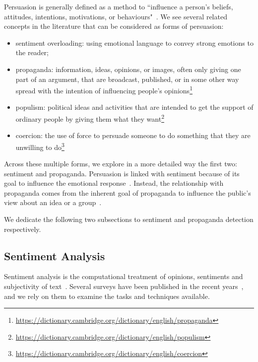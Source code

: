 Persuasion is generally defined as a method to ``influence a person's beliefs, attitudes, intentions, motivations, or behaviours"~\cite{gass2018persuasion}.
We see several related concepts in the literature that can be considered as forms of persuasion:
\begin{itemize}
    \item sentiment overloading: using emotional language to convey strong emotions to the reader; %
    \item \gls{propaganda}:  information, ideas, opinions, or images, often only giving one part of an argument, that are broadcast, published, or in some other way spread with the intention of influencing people's opinions\footnote{\url{https://dictionary.cambridge.org/dictionary/english/propaganda}} %
    \item \gls{populism}: political ideas and activities that are intended to get the support of ordinary people by giving them what they want\footnote{\url{https://dictionary.cambridge.org/dictionary/english/populism}}
    \item coercion: the use of force to persuade someone to do something that they are unwilling to do\footnote{\url{https://dictionary.cambridge.org/dictionary/english/coercion}} %
\end{itemize}

Across these multiple forms, we explore in a more detailed way the first two: sentiment and propaganda.
Persuasion is linked with sentiment because of its goal to influence the emotional response~\citep{gatti2014sentiment,rocklage2018persuasion,petty2015emotion,desteno2004discrete}.
Instead, the relationship with propaganda comes from the inherent goal of propaganda to influence the public's view about an idea or a group~\citep{bernays,jowett2018propaganda}.

We dedicate the following two subsections to sentiment and propaganda detection respectively.

\subsection{\statusgreen Sentiment Analysis}
\label{sec:lit_sentiment}


Sentiment analysis is the computational treatment of opinions, sentiments and subjectivity of text~\citep{medhat2014sentiment}.
Several surveys have been published in the recent years~\citep{liu2010sentiment,medhat2014sentiment,wankhade2022survey}, and we rely on them to examine the tasks and techniques available.


